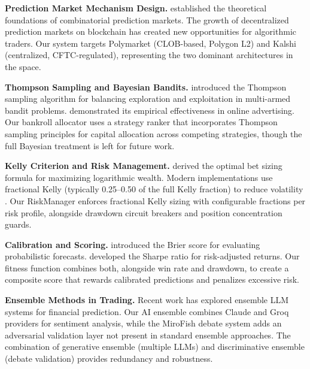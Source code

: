 \documentclass[11pt]{article}
\begin{document}
\textbf{Prediction Market Mechanism Design.} \citet{hanson2003combinatorial} established the theoretical foundations of combinatorial prediction markets. The growth of decentralized prediction markets on blockchain has created new opportunities for algorithmic traders. Our system targets Polymarket (CLOB-based, Polygon L2) and Kalshi (centralized, CFTC-regulated), representing the two dominant architectures in the space.

\textbf{Thompson Sampling and Bayesian Bandits.} \citet{thompson1933likelihood} introduced the Thompson sampling algorithm for balancing exploration and exploitation in multi-armed bandit problems. \citet{chapelle2011empirical} demonstrated its empirical effectiveness in online advertising. Our bankroll allocator uses a strategy ranker that incorporates Thompson sampling principles for capital allocation across competing strategies, though the full Bayesian treatment is left for future work.

\textbf{Kelly Criterion and Risk Management.} \citet{kelly1956new} derived the optimal bet sizing formula for maximizing logarithmic wealth. Modern implementations use fractional Kelly (typically 0.25--0.50 of the full Kelly fraction) to reduce volatility \citep{lopez2018advances}. Our RiskManager enforces fractional Kelly sizing with configurable fractions per risk profile, alongside drawdown circuit breakers and position concentration guards.

\textbf{Calibration and Scoring.} \citet{brier1950verification} introduced the Brier score for evaluating probabilistic forecasts. \citet{sharpe1964capital} developed the Sharpe ratio for risk-adjusted returns. Our fitness function combines both, alongside win rate and drawdown, to create a composite score that rewards calibrated predictions and penalizes excessive risk.

\textbf{Ensemble Methods in Trading.} Recent work has explored ensemble LLM systems for financial prediction. Our AI ensemble combines Claude and Groq providers for sentiment analysis, while the MiroFish debate system adds an adversarial validation layer not present in standard ensemble approaches. The combination of generative ensemble (multiple LLMs) and discriminative ensemble (debate validation) provides redundancy and robustness.







\end{document}
